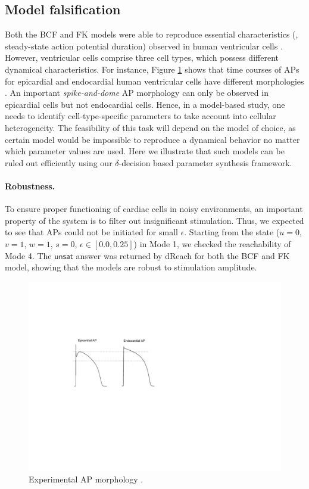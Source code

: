 \subsection{Model falsification}
Both the BCF and FK models were able to reproduce essential characteristics (\eg, steady-state action potential duration) observed in human ventricular cells \cite{fenton98,orovio08}. However, ventricular cells comprise three cell types, which possess different dynamical characteristics. For instance, Figure \ref{ap} shows that time courses of APs for epicardial and endocardial human ventricular cells have different morphologies \cite{nabauer96}. An important \textit{spike-and-dome} AP morphology can only be observed in epicardial cells but not endocardial cells. Hence, in a model-based study, one needs to identify cell-type-specific parameters to take account into cellular heterogeneity. The feasibility of this task will depend on the model of choice, as certain model would be impossible to reproduce a dynamical behavior no matter which parameter values are used. Here we illustrate that such models can be ruled out efficiently using our $\delta$-decision based parameter synthesis framework.

\paragraph{Robustness.} 
To ensure proper functioning of cardiac cells in noisy environments, an important property of the system is to filter out insignificant stimulation. Thus, we expected to see that APs could not be initiated for small $\epsilon$. Starting from the state ($u = 0$, $v = 1$, $w = 1$, $s = 0$, $\epsilon \in [0.0,0.25]$) in Mode 1, we checked the reachability of Mode 4. The $\mathsf{unsat}$ answer was returned by dReach for both the BCF and FK
model, showing that the models are robust to stimulation amplitude.

\begin{figure}[th]
\centering
\includegraphics[scale=0.8]{fig-ap}
\caption{Experimental AP morphology \cite{nabauer96}.}
\label{ap}
\end{figure}

